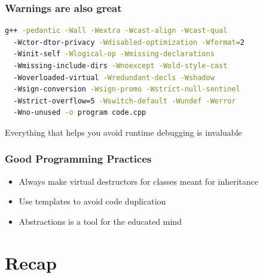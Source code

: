 \documentclass[14pt,a4paper,dvipsnames,usenames]{beamer}
\begin{document}
\begin{frame}[fragile]
  \frametitle{Warnings are also great}

  \begin{lstlisting}[language=bash,alsoletter={+},deletekeywords={dirs},basicstyle=\ttfamily\fontsize{8pt}{8pt}\selectfont]
g++ -pedantic -Wall -Wextra -Wcast-align -Wcast-qual
  -Wctor-dtor-privacy -Wdisabled-optimization -Wformat=2
  -Winit-self -Wlogical-op -Wmissing-declarations
  -Wmissing-include-dirs -Wnoexcept -Wold-style-cast
  -Woverloaded-virtual -Wredundant-decls -Wshadow
  -Wsign-conversion -Wsign-promo -Wstrict-null-sentinel
  -Wstrict-overflow=5 -Wswitch-default -Wundef -Werror
  -Wno-unused -o program code.cpp
  \end{lstlisting}

  \vspace{.5em}
  {
    Everything that helps you avoid runtime debugging is invaluable
  }
  
\end{frame}

\begin{frame}
  \frametitle{Good Programming Practices}

  \begin{itemize}
    \setlength\itemsep{0.5em}
    \item Always make {\color{FeebleWeek}virtual} destructors for classes meant for inheritance
    \item Use templates to avoid code duplication
    \item Abstractions is a tool for the educated mind
  \end{itemize}

  \begin{center}
  \end{center}
  
\end{frame}

\section{Recap}
\end{document}
